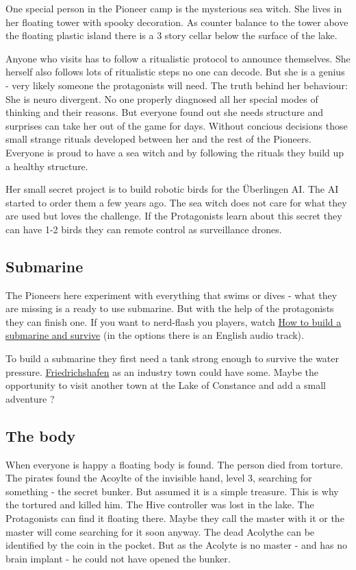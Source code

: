 One special person in the Pioneer camp is the mysterious sea witch. She lives in her floating tower with spooky decoration. As counter balance to the tower above the floating plastic island there is a 3 story cellar below the surface of the lake.

Anyone who visits has to follow a ritualistic protocol to announce themselves. She herself also follows lots of ritualistic steps no one can decode. But she is a genius - very likely someone the protagonists will need.
The truth behind her behaviour: She is neuro divergent. No one properly diagnosed all her special modes of thinking and their reasons. But everyone found out she needs structure and surprises can take her out of the game for days.
Without concious decisions those small strange rituals developed between her and the rest of the Pioneers. Everyone is proud to have a sea witch and by following the rituals they build up a healthy structure.

Her small secret project is to build robotic birds for the Überlingen AI. The AI started to order them a few years ago. The sea witch does not care for what they are used but loves the challenge. If the Protagonists learn about this secret they can have 1-2 birds they can remote control as surveillance drones.

\subsection{Submarine}

The Pioneers here experiment with everything that swims or dives - what they are missing is a ready to use submarine. But with the help of the protagonists they can finish one. If you want to nerd-flash you players, watch \href{https://media.ccc.de/v/37c3-11828-how_to_build_a_submarine_and_survive}{How to build a submarine and survive} (in the options there is an English audio track).

To build a submarine they first need a tank strong enough to survive the water pressure. \hyperref[subsec:Friedrichshafen]{Friedrichshafen} as an industry town could have some. Maybe the opportunity to visit another town at the Lake of Constance and add a small adventure ?

\subsection{The body}

When everyone is happy a floating body is found. The person died from torture. The pirates found the Acoylte of the invisible hand, level 3, searching for something - the secret bunker. But assumed it is a simple treasure. This is why the tortured and killed him. The Hive controller was lost in the lake. The Protagonists can find it floating there. Maybe they call the master with it or the master will come searching for it soon anyway.
The dead Acolythe can be identified by the coin in the pocket. But as the Acolyte is no master - and has no brain implant - he could not have opened the bunker.

